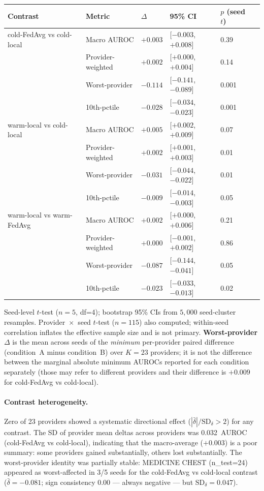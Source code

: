 \begin{tabular}{@{}llllll@{}}
\hline
Contrast & Metric & $\Delta$ & 95\% CI & $p$ (seed $t$) \\
\hline
cold-FedAvg vs cold-local & Macro AUROC      & $+0.003$ & [$-0.003$, $+0.008$]  & 0.39 \\
                          & Provider-weighted & $+0.002$ & [$+0.000$, $+0.004$]  & 0.14 \\
                          & Worst-provider    & $-0.114$ & [$-0.141$, $-0.089$]  & 0.001 \\
                          & 10th-pctile       & $-0.028$ & [$-0.034$, $-0.023$]  & 0.001 \\
\hline
warm-local vs cold-local  & Macro AUROC      & $+0.005$ & [$+0.002$, $+0.009$]  & 0.07 \\
                          & Provider-weighted & $+0.002$ & [$+0.001$, $+0.003$]  & 0.01 \\
                          & Worst-provider    & $-0.031$ & [$-0.044$, $-0.022$]  & 0.01 \\
                          & 10th-pctile       & $-0.009$ & [$-0.014$, $-0.003$]  & 0.05 \\
\hline
warm-local vs warm-FedAvg & Macro AUROC      & $+0.002$ & [$+0.000$, $+0.006$]  & 0.21 \\
                          & Provider-weighted & $+0.000$ & [$-0.001$, $+0.002$]  & 0.86 \\
                          & Worst-provider    & $-0.087$ & [$-0.144$, $-0.041$]  & 0.05 \\
                          & 10th-pctile       & $-0.023$ & [$-0.033$, $-0.013$]  & 0.02 \\
\hline
\end{tabular}

\noindent Seed-level $t$-test ($n=5$, df=4); bootstrap 95\% CIs from $5{,}000$
seed-cluster resamples.
Provider~$\times$~seed $t$-test ($n=115$) also computed; within-seed
correlation inflates the effective sample size and is not primary.
\textbf{Worst-provider} $\Delta$ is the mean across seeds of the
\emph{minimum} per-provider paired difference (condition~A minus condition~B)
over $K=23$ providers; it is not the difference between the marginal
absolute minimum AUROCs reported for each condition separately (those may
refer to different providers and their difference is $+0.009$ for
cold-FedAvg vs cold-local).

\paragraph{Contrast heterogeneity.}
Zero of 23 providers showed a systematic directional effect
($|\bar{\delta}|/\mathrm{SD}_\delta > 2$) for any contrast.
The SD of provider mean deltas across providers was 0.032~AUROC (cold-FedAvg
vs cold-local), indicating that the macro-average ($+0.003$) is a poor
summary: some providers gained substantially, others lost substantially.
The worst-provider identity was partially stable: MEDICINE CHEST
(n\_test=24) appeared as worst-affected in 3/5 seeds for the cold-FedAvg
vs cold-local contrast ($\bar{\delta}=-0.081$; sign consistency 0.00 ---
always negative --- but $\mathrm{SD}_\delta=0.047$).

